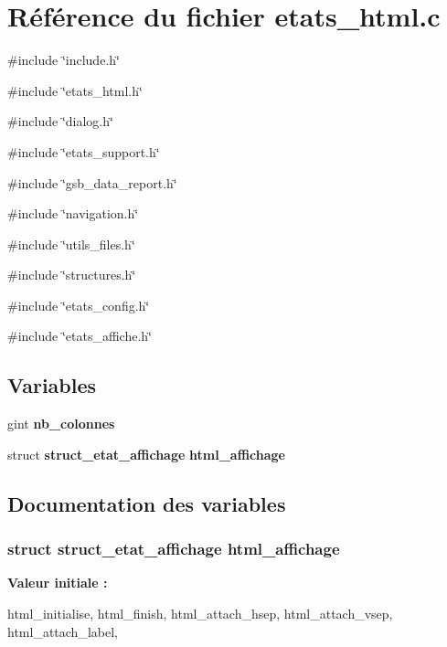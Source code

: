 \section{Référence du fichier etats\_\-html.c}
\label{etats__html_8c}
{\ttfamily \#include \char`\"{}include.h\char`\"{}}\par
{\ttfamily \#include \char`\"{}etats\_\-html.h\char`\"{}}\par
{\ttfamily \#include \char`\"{}dialog.h\char`\"{}}\par
{\ttfamily \#include \char`\"{}etats\_\-support.h\char`\"{}}\par
{\ttfamily \#include \char`\"{}gsb\_\-data\_\-report.h\char`\"{}}\par
{\ttfamily \#include \char`\"{}navigation.h\char`\"{}}\par
{\ttfamily \#include \char`\"{}utils\_\-files.h\char`\"{}}\par
{\ttfamily \#include \char`\"{}structures.h\char`\"{}}\par
{\ttfamily \#include \char`\"{}etats\_\-config.h\char`\"{}}\par
{\ttfamily \#include \char`\"{}etats\_\-affiche.h\char`\"{}}\par
\subsection*{Variables}
\begin{DoxyCompactItemize}
\item 
gint {\bf nb\_\-colonnes}
\item 
struct {\bf struct\_\-etat\_\-affichage} {\bf html\_\-affichage}
\end{DoxyCompactItemize}


\subsection{Documentation des variables}
\subsubsection[{html\_\-affichage}]{\setlength{\rightskip}{0pt plus 5cm}struct {\bf struct\_\-etat\_\-affichage} {\bf html\_\-affichage}}\label{etats__html_8c_a82e802227c548b6c4ff47ca8b6c4958b}
{\bfseries Valeur initiale :}
\begin{DoxyCode}
 {
    html_initialise,
    html_finish,
    html_attach_hsep,
    html_attach_vsep,
    html_attach_label,
}
\end{DoxyCode}


